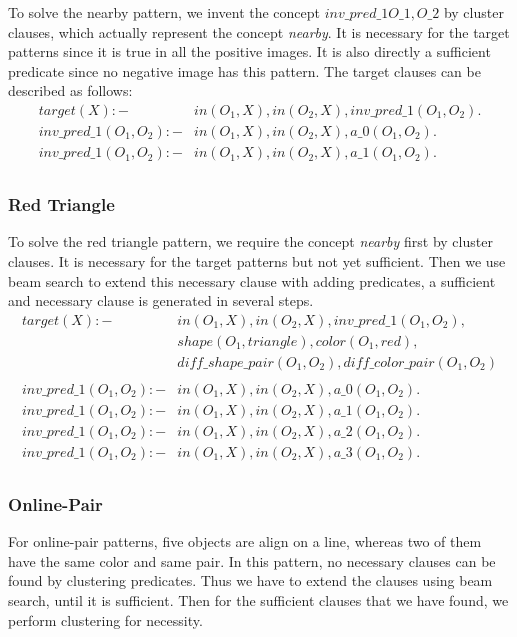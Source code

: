 \documentclass[
]{ceurart}
\begin{document}
\newpage
To solve the nearby pattern, we invent the concept $ inv\_pred\_1O\_1, O\_2 $ by cluster clauses, which actually represent the concept \textit{nearby}. It is necessary for the target patterns since it is true in all the positive images. It is also directly a sufficient predicate since no negative image has this pattern. The target clauses can be described as follows:
\begin{align*}
	target(X) :- & in(O_1,X),in(O_2,X), inv\_pred\_1(O_1,O_2).\\
	inv\_pred\_1(O_1, O_2) :- 	& in(O_1,X), in(O_2,X), a\_0(O_1,O_2).\\
	inv\_pred\_1(O_1, O_2) :- 	& in(O_1,X), in(O_2,X), a\_1(O_1,O_2).\\									
\end{align*}

\subsubsection{Red Triangle}
To solve the red triangle pattern, we require the concept \textit{nearby} first by cluster clauses. It is necessary for the target patterns but not yet sufficient. Then we use beam search to extend this necessary clause with adding predicates, a sufficient and necessary clause is generated in several steps.
\begin{align*}
	target(X) :- & in(O_1,X),in(O_2,X), inv\_pred\_1(O_1,O_2), \\
						& shape(O_1, triangle), color(O_1, red), \\
						& diff\_shape\_pair(O_1,O_2), diff\_color\_pair(O_1,O_2)\\
	\\
	inv\_pred\_1(O_1, O_2) :- 	& in(O_1,X), in(O_2,X), a\_0(O_1,O_2).\\
	inv\_pred\_1(O_1, O_2) :- 	& in(O_1,X), in(O_2,X), a\_1(O_1,O_2).\\		
	inv\_pred\_1(O_1, O_2) :- 	& in(O_1,X), in(O_2,X), a\_2(O_1,O_2).\\																
	inv\_pred\_1(O_1, O_2) :- 	& in(O_1,X), in(O_2,X), a\_3(O_1,O_2).\\									
\end{align*}

\subsubsection{Online-Pair}
For online-pair patterns, five objects are align on a line, whereas two of them have the same color and same pair. 
In this pattern, no necessary clauses can be found  by clustering predicates. Thus we have to extend the clauses using beam search, until it is sufficient. Then for the sufficient clauses that we have found, we perform clustering for necessity.
\end{document}
